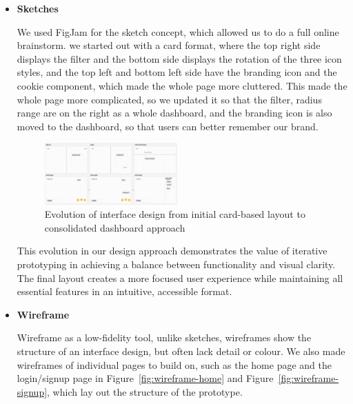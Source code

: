 \begin{itemize}
\item \textbf{Sketches}

We used FigJam for the sketch concept, which allowed us to do a full online brainstorm. we started out with a card format, where the top right side displays the filter and the bottom side displays the rotation of the three icon styles, and the top left and bottom left side have the branding icon and the cookie component, which made the whole page more cluttered. This made the whole page more complicated, so we updated it so that the filter, radius range are on the right as a whole dashboard, and the branding icon is also moved to the dashboard, so that users can better remember our brand.


\begin{figure}[h]
    \centering
    \includegraphics[width=0.48\textwidth]{images/sketch.jpg}
    \caption{Evolution of interface design from initial card-based layout to consolidated dashboard approach}
    \label{fig:prototype-evolution}
\end{figure}
This evolution in our design approach demonstrates the value of iterative prototyping in achieving a balance between functionality and visual clarity. The final layout creates a more focused user experience while maintaining all essential features in an intuitive, accessible format.


\item \textbf{Wireframe}

Wireframe as a low-fidelity tool, unlike sketches, wireframes show the structure of an interface design, but often lack detail or colour. We also made wireframes of individual pages to build on, such as the home page and the login/signup page in Figure~\ref{fig:wireframe-home} and Figure~\ref{fig:wireframe-signup}, which lay out the structure of the prototype.
\end{itemize}

